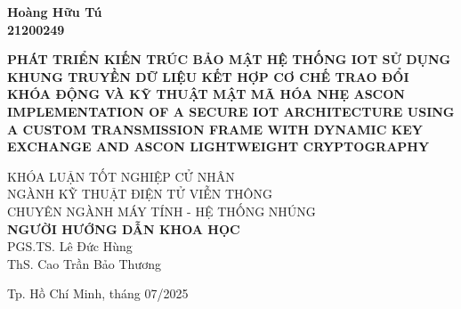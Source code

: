 \begin{titlepage}
\begin{center}
{\large \bfseries Hoàng Hữu Tú\\} 
{\large \bfseries 21200249\\[1.5cm]} 


{ \large \bfseries PHÁT TRIỂN KIẾN TRÚC BẢO MẬT HỆ THỐNG IOT SỬ DỤNG KHUNG TRUYỀN DỮ LIỆU KẾT HỢP CƠ CHẾ TRAO ĐỔI KHÓA ĐỘNG VÀ KỸ THUẬT MẬT MÃ HÓA NHẸ ASCON\\[1cm] } 
{ \large \bfseries IMPLEMENTATION OF A SECURE IOT ARCHITECTURE USING A CUSTOM TRANSMISSION FRAME WITH DYNAMIC KEY EXCHANGE AND ASCON LIGHTWEIGHT CRYPTOGRAPHY\\[2cm] } 

\large KHÓA LUẬN TỐT NGHIỆP CỬ NHÂN\\
\large NGÀNH KỸ THUẬT ĐIỆN TỬ VIỄN THÔNG\\
\large CHUYÊN NGÀNH MÁY TÍNH - HỆ THỐNG NHÚNG\\[1.5cm]

\textbf{NGƯỜI HƯỚNG DẪN KHOA HỌC}\\
PGS.TS. Lê Đức Hùng \\
ThS. Cao Trần Bảo Thương


\vfill
Tp. Hồ Chí Minh, tháng 07/2025

\end{center}

\end{titlepage}